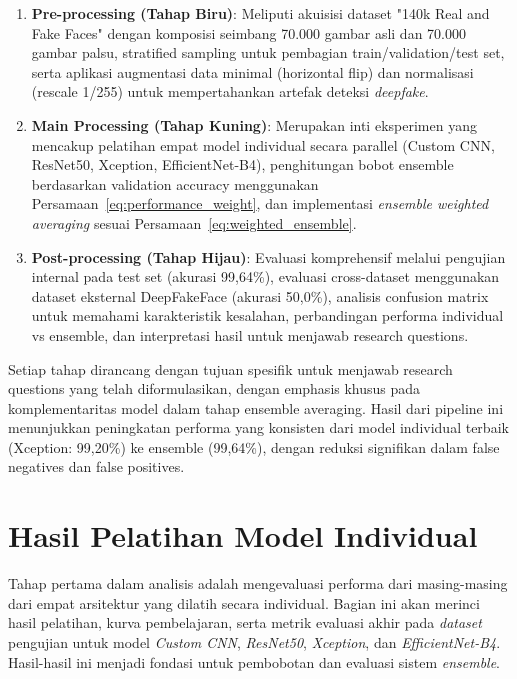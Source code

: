 \begin{enumerate}
    \item \textbf{Pre-processing (Tahap Biru)}: Meliputi akuisisi dataset "140k Real and Fake Faces" dengan komposisi seimbang 70.000 gambar asli dan 70.000 gambar palsu, stratified sampling untuk pembagian train/validation/test set, serta aplikasi augmentasi data minimal (horizontal flip) dan normalisasi (rescale 1/255) untuk mempertahankan artefak deteksi \textit{deepfake}.

    \item \textbf{Main Processing (Tahap Kuning)}: Merupakan inti eksperimen yang mencakup pelatihan empat model individual secara parallel (Custom CNN, ResNet50, Xception, EfficientNet-B4), penghitungan bobot ensemble berdasarkan validation accuracy menggunakan Persamaan~\ref{eq:performance_weight}, dan implementasi \textit{ensemble weighted averaging} sesuai Persamaan~\ref{eq:weighted_ensemble}.

    \item \textbf{Post-processing (Tahap Hijau)}: Evaluasi komprehensif melalui pengujian internal pada test set (akurasi 99,64\%), evaluasi cross-dataset menggunakan dataset eksternal DeepFakeFace (akurasi 50,0\%), analisis confusion matrix untuk memahami karakteristik kesalahan, perbandingan performa individual vs ensemble, dan interpretasi hasil untuk menjawab research questions.
\end{enumerate}

Setiap tahap dirancang dengan tujuan spesifik untuk menjawab research questions yang telah diformulasikan, dengan emphasis khusus pada komplementaritas model dalam tahap ensemble averaging. Hasil dari pipeline ini menunjukkan peningkatan performa yang konsisten dari model individual terbaik (Xception: 99,20\%) ke ensemble (99,64\%), dengan reduksi signifikan dalam false negatives dan false positives.

\section{Hasil Pelatihan Model Individual}
Tahap pertama dalam analisis adalah mengevaluasi performa dari masing-masing dari empat arsitektur yang dilatih secara individual. Bagian ini akan merinci hasil pelatihan, kurva pembelajaran, serta metrik evaluasi akhir pada \textit{dataset} pengujian untuk model \textit{Custom CNN}, \textit{ResNet50}, \textit{Xception}, dan \textit{EfficientNet-B4}. Hasil-hasil ini menjadi fondasi untuk pembobotan dan evaluasi sistem \textit{ensemble}.


